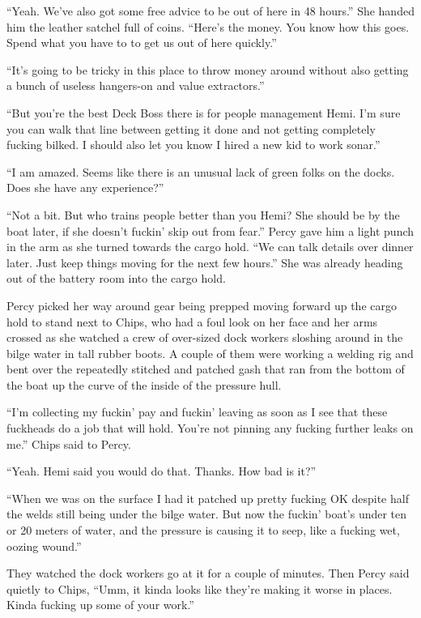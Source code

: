 \documentclass[]{scrbook}
\begin{document}
``Yeah. We've also got some free advice to be out of here in 48 hours.''
She handed him the leather satchel full of coins. ``Here's the money.
You know how this goes. Spend what you have to to get us out of here
quickly.''

``It's going to be tricky in this place to throw money around without
also getting a bunch of useless hangers-on and value extractors.''

``But you're the best Deck Boss there is for people management Hemi. I'm
sure you can walk that line between getting it done and not getting
completely fucking bilked. I should also let you know I hired a new kid
to work sonar.''

``I am amazed. Seems like there is an unusual lack of green folks on the
docks. Does she have any experience?''

``Not a bit. But who trains people better than you Hemi? She should be
by the boat later, if she doesn't fuckin' skip out from fear.'' Percy
gave him a light punch in the arm as she turned towards the cargo hold.
``We can talk details over dinner later. Just keep things moving for the
next few hours.'' She was already heading out of the battery room into
the cargo hold.

Percy picked her way around gear being prepped moving forward up the
cargo hold to stand next to Chips, who had a foul look on her face and
her arms crossed as she watched a crew of over-sized dock workers
sloshing around in the bilge water in tall rubber boots. A couple of
them were working a welding rig and bent over the repeatedly stitched
and patched gash that ran from the bottom of the boat up the curve of
the inside of the pressure hull.

``I'm collecting my fuckin' pay and fuckin' leaving as soon as I see
that these fuckheads do a job that will hold. You're not pinning any
fucking further leaks on me.'' Chips said to Percy.

``Yeah. Hemi said you would do that. Thanks. How bad is it?''

``When we was on the surface I had it patched up pretty fucking OK
despite half the welds still being under the bilge water. But now the
fuckin' boat's under ten or 20 meters of water, and the pressure is
causing it to seep, like a fucking wet, oozing wound.''

They watched the dock workers go at it for a couple of minutes. Then
Percy said quietly to Chips, ``Umm, it kinda looks like they're making
it worse in places. Kinda fucking up some of your work.''
\end{document}
